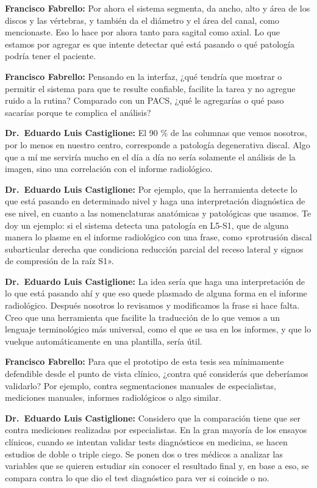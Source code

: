 \noindent\textbf{Francisco Fabrello:} Por ahora el sistema segmenta, da ancho, alto y área de los discos y las vértebras, y también da el diámetro y el área del canal, como mencionaste. Eso lo hace por ahora tanto para sagital como axial. Lo que estamos por agregar es que intente detectar qué está pasando o qué patología podría tener el paciente.

\noindent\textbf{Francisco Fabrello:} Pensando en la interfaz, ¿qué tendría que mostrar o permitir el sistema para que te resulte confiable, facilite la tarea y no agregue ruido a la rutina? Comparado con un PACS, ¿qué le agregarías o qué paso sacarías porque te complica el análisis?

\noindent\textbf{Dr.~Eduardo Luis Castiglione:} El 90 \% de las columnas que vemos nosotros, por lo menos en nuestro centro, corresponde a patología degenerativa discal. Algo que a mí me serviría mucho en el día a día no sería solamente el análisis de la imagen, sino una correlación con el informe radiológico.

\noindent\textbf{Dr.~Eduardo Luis Castiglione:} Por ejemplo, que la herramienta detecte lo que está pasando en determinado nivel y haga una interpretación diagnóstica de ese nivel, en cuanto a las nomenclaturas anatómicas y patológicas que usamos. Te doy un ejemplo: si el sistema detecta una patología en L5-S1, que de alguna manera lo plasme en el informe radiológico con una frase, como «protrusión discal subarticular derecha que condiciona reducción parcial del receso lateral y signos de compresión de la raíz S1».

\noindent\textbf{Dr.~Eduardo Luis Castiglione:} La idea sería que haga una interpretación de lo que está pasando ahí y que eso quede plasmado de alguna forma en el informe radiológico. Después nosotros lo revisamos y modificamos la frase si hace falta. Creo que una herramienta que facilite la traducción de lo que vemos a un lenguaje terminológico más universal, como el que se usa en los informes, y que lo vuelque automáticamente en una plantilla, sería útil.

\noindent\textbf{Francisco Fabrello:} Para que el prototipo de esta tesis sea mínimamente defendible desde el punto de vista clínico, ¿contra qué considerás que deberíamos validarlo? Por ejemplo, contra segmentaciones manuales de especialistas, mediciones manuales, informes radiológicos o algo similar.

\noindent\textbf{Dr.~Eduardo Luis Castiglione:} Considero que la comparación tiene que ser contra mediciones realizadas por especialistas. En la gran mayoría de los ensayos clínicos, cuando se intentan validar tests diagnósticos en medicina, se hacen estudios de doble o triple ciego. Se ponen dos o tres médicos a analizar las variables que se quieren estudiar sin conocer el resultado final y, en base a eso, se compara contra lo que dio el test diagnóstico para ver si coincide o no.

